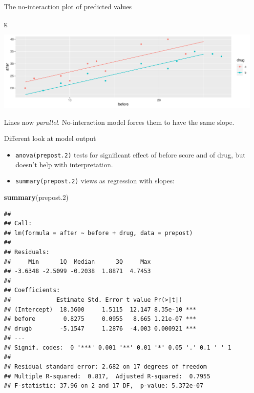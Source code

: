 \documentclass[
  ignorenonframetext,
]{beamer}
\newenvironment{Shaded}{\begin{snugshade}}{\end{snugshade}}
\newcommand{\FloatTok}[1]{\textcolor[rgb]{0.00,0.00,0.81}{#1}}
\newcommand{\KeywordTok}[1]{\textcolor[rgb]{0.13,0.29,0.53}{\textbf{#1}}}
\newcommand{\NormalTok}[1]{#1}
\begin{document}
\begin{frame}[fragile]{The no-interaction plot of predicted values}
\protect\hypertarget{the-no-interaction-plot-of-predicted-values}{}

\begin{Shaded}
\begin{Highlighting}[]
\NormalTok{g}
\end{Highlighting}
\end{Shaded}

\includegraphics{slides_d29_files/figure-beamer/cabazzo-1.pdf}

Lines now \emph{parallel}. No-interaction model forces them to have the
same slope.

\end{frame}

\begin{frame}[fragile]{Different look at model output}
\protect\hypertarget{different-look-at-model-output}{}

\begin{itemize}
\item
  \texttt{anova(prepost.2)} tests for significant effect of before score
  and of drug, but doesn't help with interpretation.
\item
  \texttt{summary(prepost.2)} views as regression with slopes:
\end{itemize}

\scriptsize

\begin{Shaded}
\begin{Highlighting}[]
\KeywordTok{summary}\NormalTok{(prepost}\FloatTok{.2}\NormalTok{)}
\end{Highlighting}
\end{Shaded}

\begin{verbatim}
## 
## Call:
## lm(formula = after ~ before + drug, data = prepost)
## 
## Residuals:
##     Min      1Q  Median      3Q     Max 
## -3.6348 -2.5099 -0.2038  1.8871  4.7453 
## 
## Coefficients:
##             Estimate Std. Error t value Pr(>|t|)    
## (Intercept)  18.3600     1.5115  12.147 8.35e-10 ***
## before        0.8275     0.0955   8.665 1.21e-07 ***
## drugb        -5.1547     1.2876  -4.003 0.000921 ***
## ---
## Signif. codes:  0 '***' 0.001 '**' 0.01 '*' 0.05 '.' 0.1 ' ' 1
## 
## Residual standard error: 2.682 on 17 degrees of freedom
## Multiple R-squared:  0.817,  Adjusted R-squared:  0.7955 
## F-statistic: 37.96 on 2 and 17 DF,  p-value: 5.372e-07
\end{verbatim}

\normalsize

\end{frame}
\end{document}
